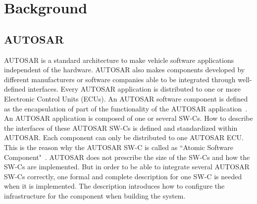 \section{Background}\label{sec:background}



\subsection{AUTOSAR}

AUTOSAR is a standard architecture to make vehicle software applications independent of the hardware. 
AUTOSAR also makes components developed by different manufacturers or software companies able to be integrated through well-defined interfaces.
Every AUTOSAR application is distributed to one or more Electronic Control Units (ECUs). 
An AUTOSAR software component is defined as the encapsulation of part of the functionality of the AUTOSAR application~\cite{aa}. An AUTOSAR application is composed of one or several SW-Cs. How to describe the interfaces of these AUTOSAR SW-Cs is defined and standardized within AUTOSAR. Each component can only be distributed to one AUTOSAR ECU. This is the reason why the AUTOSAR SW-C is called as ``Atomic Software Component"~\cite{aa}. AUTOSAR does not prescribe the size of the SW-Cs and how the SW-Cs are implemented. But in order to be able to  integrate several AUTOSAR SW-Cs correctly, one formal and complete description for one SW-C is needed when it is implemented. The description introduces how to configure the infrastructure for the component when building the system. 


